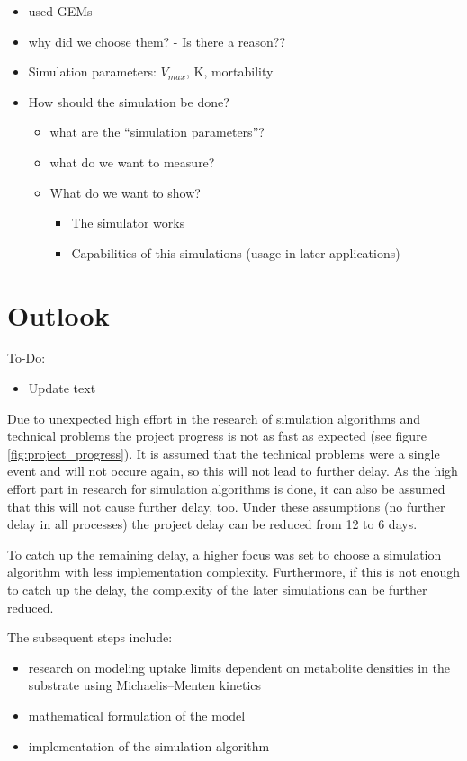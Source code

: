 \documentclass[a4paper,10pt]{article}
\begin{document}
\begin{itemize}
 \item used GEMs
 \item why did we choose them? - Is there a reason??
 \item Simulation parameters: $V_{max}$, K, mortability
 \item How should the simulation be done?
 \begin{itemize}
  \item what are the ``simulation parameters''?
  \item what do we want to measure?
  \item What do we want to show?
  \begin{itemize}
   \item The simulator works
   \item Capabilities of this simulations (usage in later applications)
  \end{itemize}
 \end{itemize}
\end{itemize}



\section{Outlook}

To-Do:
\begin{itemize}
 \item Update text
\end{itemize}


Due to unexpected high effort in the research of simulation algorithms and technical problems the project progress is not as fast
as expected (see figure \ref{fig:project_progress}). It is assumed that the technical problems were a single event and will not
occure again, so this will not lead to further delay. As the high effort part in research for simulation algorithms is done, it
can also be assumed that this will not cause further delay, too. Under these assumptions (no further delay in all processes) the
project delay can be reduced from 12 to 6 days.

To catch up the remaining delay, a higher focus was set to choose a simulation algorithm with less implementation complexity.
Furthermore, if this is not enough to catch up the delay, the complexity of the later simulations can be further reduced.

\vspace{0.5cm}
The subsequent steps include:
\begin{itemize}
 \item research on modeling uptake limits dependent on metabolite densities in the substrate using Michaelis–Menten kinetics
 \item mathematical formulation of the model
 \item implementation of the simulation algorithm
\end{itemize}




\newpage

\printbibliography
\end{document}
